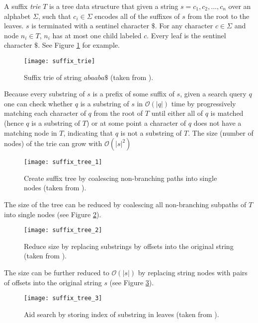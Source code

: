 A suffix \emph{trie} $T$ is a tree data structure that given a string $s=c_1,c_2,...,c_n$ over an alphabet $\Sigma$, such that $c_i \in \Sigma$ encodes all of the suffixes of $s$ from the root to the leaves. $s$ is terminated with a sentinel character $\$$. For any character $c \in \Sigma$ and node $n_i \in T$, $n_i$ has at most one child labeled $c$. Every leaf is the sentinel character $\$$. See Figure \ref{fig:suffix_trie} for example.

\begin{figure}[h!]
    \texttt{[image: suffix\_trie]}
    \centering
    \caption {Suffix trie of string $abaaba\$$ (taken from \autocite{langmead_teaching}).}
    \label{fig:suffix_trie}
\end{figure}

Because every substring of $s$ is a prefix of some suffix of $s$, given a search query $q$ one can check whether $q$ is a substring of $s$ in $\mathcal{O}(|q|)$ time by progressively matching each character of $q$ from the root of $T$ until either all of $q$ is matched (hence $q$ is a substring of $T$) or at some point a character of $q$ does not have a matching node in $T$, indicating that $q$ is not a substring of $T$. The size (number of nodes) of the trie can grow with $\mathcal{O}(|s|^2)$  

\begin{figure}[H]
    \texttt{[image: suffix\_tree\_1]}
    \centering
    \caption {Create suffix tree by coalescing non-branching paths into single nodes (taken from \autocite{langmead_teaching}).}
    \label{fig:suffix_tree_1}
\end{figure}

The size of the tree can be reduced by coalescing all non-branching subpaths of $T$ into single nodes (see Figure \ref{fig:suffix_tree_1}). 

\begin{figure}[H]
    \texttt{[image: suffix\_tree\_2]}
    \centering
    \caption {Reduce size by replacing substrings by offsets into the original string (taken from \autocite{langmead_teaching}).}
    \label{fig:suffix_tree_2}
\end{figure}

The size can be further reduced to $\mathcal{O}(|s|)$ by replacing string nodes with pairs of offsets into the original string $s$ (see Figure \ref{fig:suffix_tree_2}).

\begin{figure}[H]
    \texttt{[image: suffix\_tree\_3]}
    \centering
    \caption {Aid search by storing index of substring in leaves (taken from \autocite{langmead_teaching}).}
    \label{fig:suffix_tree_3}
\end{figure}

